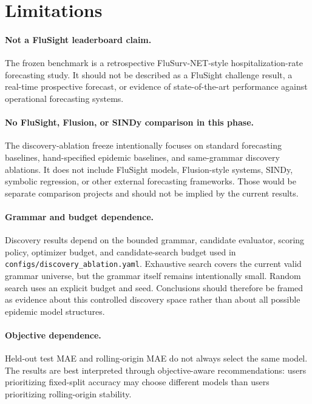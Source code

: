 \section{Limitations}

\paragraph{Not a FluSight leaderboard claim.}
The frozen benchmark is a retrospective FluSurv-NET-style hospitalization-rate
forecasting study. It should not be described as a FluSight challenge result,
a real-time prospective forecast, or evidence of state-of-the-art performance
against operational forecasting systems.

\paragraph{No FluSight, Flusion, or SINDy comparison in this phase.}
The discovery-ablation freeze intentionally focuses on standard forecasting
baselines, hand-specified epidemic baselines, and same-grammar discovery
ablations. It does not include FluSight models, Flusion-style systems, SINDy,
symbolic regression, or other external forecasting frameworks. Those would be
separate comparison projects and should not be implied by the current results.

\paragraph{Grammar and budget dependence.}
Discovery results depend on the bounded grammar, candidate evaluator, scoring
policy, optimizer budget, and candidate-search budget used in
\texttt{configs/discovery\_ablation.yaml}. Exhaustive search covers the current
valid grammar universe, but the grammar itself remains intentionally small.
Random search uses an explicit budget and seed. Conclusions should therefore
be framed as evidence about this controlled discovery space rather than about
all possible epidemic model structures.

\paragraph{Objective dependence.}
Held-out test MAE and rolling-origin MAE do not always select the same model.
The results are best interpreted through objective-aware recommendations:
users prioritizing fixed-split accuracy may choose different models than users
prioritizing rolling-origin stability.

